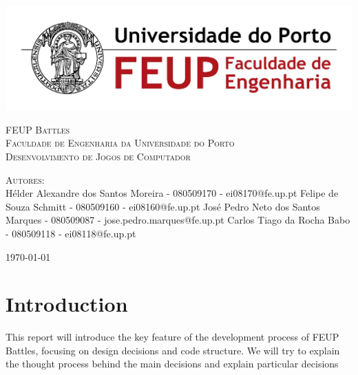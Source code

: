 \documentclass[11pt,a4paper]{report}
\begin{document}
\renewcommand{\thechapter}{}
\renewcommand{\chaptername}{}
\renewcommand{\thesection}{}

\begin{titlepage}

\begin{center}

\includegraphics{feup}  

\vspace{10 mm}

\textsc{\LARGE FEUP Battles} \\
\vspace{20 mm}
\textsc{\normalsize Faculdade de Engenharia da Universidade do Porto} \\
\textsc{\normalsize Desenvolvimento de Jogos de Computador} \\
\vspace{20 mm}



\vfill
\textsc{Autores:}\\
H\'elder Alexandre dos Santos Moreira - 080509170 - ei08170@fe.up.pt
Felipe de Souza Schmitt - 080509160 - ei08160@fe.up.pt
Jos\'e Pedro Neto dos Santos Marques - 080509087 - jose.pedro.marques@fe.up.pt
Carlos Tiago da Rocha Babo - 080509118 - ei08118@fe.up.pt

\vspace{5 mm}

{\large \today}

\end{center}

\end{titlepage}

\newpage

\tableofcontents
\setcounter{tocdepth}{1}

\newpage

\chapter{Introduction}

This report will introduce the key feature of the development process of FEUP Battles, focusing on design decisions and code structure. We will try to explain the thought process behind the main decisions and explain particular decisions
\end{document}
